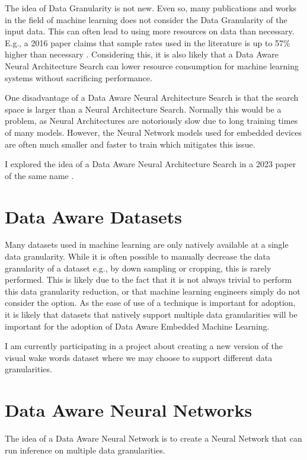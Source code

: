 \documentclass{acaces}
\begin{document}
The idea of Data Granularity is not new.
Even so, many publications and works in the field of machine learning does not consider the Data Granularity of the input data. 
This can often lead to using more resources on data than necessary. 
E.g., a 2016 paper claims that sample rates used in the literature is up to 57\% higher than necessary \cite{khan2016optimising}.
Considering this, it is also likely that a Data Aware Neural Architecture Search can lower resource consumption for machine learning systems without sacrificing performance.

One disadvantage of a Data Aware Neural Architecture Search is that the search space is larger than a Neural Architecture Search.
Normally this would be a problem, as Neural Architectures are notoriously slow due to long training times of many models.
However, the Neural Network models used for embedded devices are often much smaller and faster to train which mitigates this issue.

I explored the idea of a Data Aware Neural Architecture Search in a 2023 paper of the same name \cite{njor2023data}.

\section{Data Aware Datasets}
Many datasets used in machine learning are only natively available at a single data granularity.
While it is often possible to manually decrease the data granularity of a dataset e.g., by down sampling or cropping, this is rarely performed.
This is likely due to the fact that it is not always trivial to perform this data granularity reduction, or that machine learning engineers simply do not consider the option.
As the ease of use of a technique is important for adoption, it is likely that datasets that natively support multiple data granularities will be important for the adoption of Data Aware Embedded Machine Learning.

I am currently participating in a project about creating a new version of the visual wake words dataset\cite{chowdhery2019visual} where we may choose to support different data granularities.

\section{Data Aware Neural Networks}
The idea of a Data Aware Neural Network is to create a Neural Network that can run inference on multiple data granularities.



\end{document}
